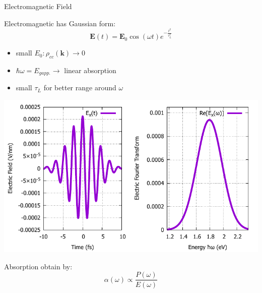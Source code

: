\documentclass{beamer}
\begin{document}
	\begin{frame}{Electromagnetic Field}
	\begin{multicols}{2}
Electromagnetic has Gaussian form:
\begin{equation}
	\textbf{E}(t) = \textbf{E}_0 \cos(\omega t)e^{-\frac{t^2}{\tau_L^2}}
\end{equation}
\begin{itemize}
	\item small $E_0: \rho_{cc}(\textbf{k}) \to 0$
	\item $\hbar \omega = E_{gapp.} \to $ linear absorption
	\item small $\tau_L$ for better range around $\omega$
\end{itemize}
\columnbreak
\includegraphics[width=1\linewidth]{images/Eat.pdf}

Absorption obtain by\cite{haug_quantum_2009}:
\begin{equation}
	\alpha(\omega) \propto \frac{P(\omega)}{E(\omega)}
\end{equation}
	\end{multicols}
	\end{frame}
\end{document}
